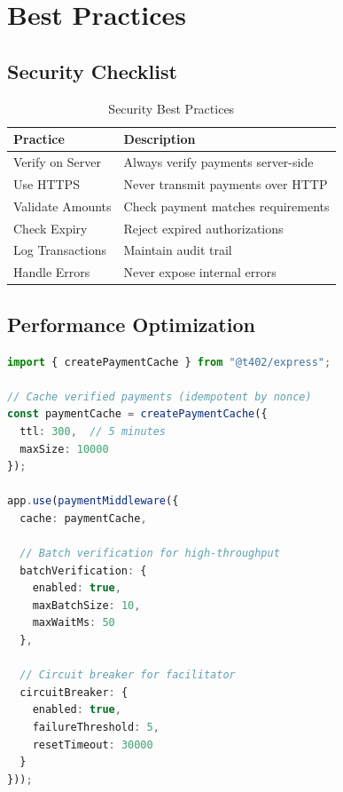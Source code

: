 \section{Best Practices}
\label{sec:best-practices}

\subsection{Security Checklist}

\begin{table}[htbp]
\centering
\caption{Security Best Practices}
\label{tab:security-checklist}
\begin{tabular}{l p{7cm}}
\toprule
\textbf{Practice} & \textbf{Description} \\
\midrule
Verify on Server & Always verify payments server-side \\
Use HTTPS & Never transmit payments over HTTP \\
Validate Amounts & Check payment matches requirements \\
Check Expiry & Reject expired authorizations \\
Log Transactions & Maintain audit trail \\
Handle Errors & Never expose internal errors \\
\bottomrule
\end{tabular}
\end{table}

\subsection{Performance Optimization}

\begin{lstlisting}[language=typescript,caption={Caching and optimization}]
import { createPaymentCache } from "@t402/express";

// Cache verified payments (idempotent by nonce)
const paymentCache = createPaymentCache({
  ttl: 300,  // 5 minutes
  maxSize: 10000
});

app.use(paymentMiddleware({
  cache: paymentCache,

  // Batch verification for high-throughput
  batchVerification: {
    enabled: true,
    maxBatchSize: 10,
    maxWaitMs: 50
  },

  // Circuit breaker for facilitator
  circuitBreaker: {
    enabled: true,
    failureThreshold: 5,
    resetTimeout: 30000
  }
}));
\end{lstlisting}

